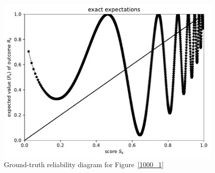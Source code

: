 \documentclass{article}
\begin{document}
\begin{figure}
\begin{centering}

\parbox{\imsize}{\includegraphics[width=\imsize]
                {./codes/unweighted/1000_10_2_1/exact.pdf}}

\end{centering}
\caption{Ground-truth reliability diagram for Figure~\ref{1000_1}}
\label{1000_1e}
\end{figure}
\end{document}
